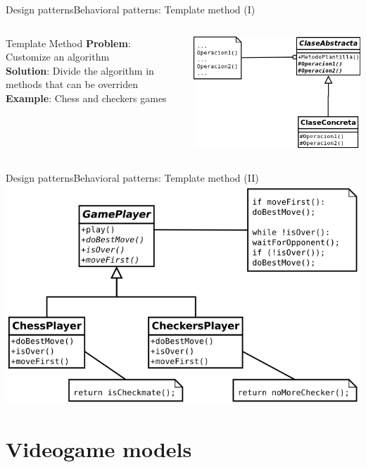 \documentclass[10pt,compress]{beamer} %
\begin{document}
\begin{frame}{Design patterns}{Behavioral patterns: Template method (I)}
    \begin{columns}
	   \begin{block}{Template Method}
			\textbf{Problem}: Customize an algorithm\\
			\textbf{Solution}: Divide the algorithm in methods that can be overriden\\
			\textbf{Example}: Chess and checkers games\\
		\end{block}
			\centering\includegraphics[width=0.8\linewidth]{figs/template}\\
	\end{columns}
\end{frame}

\begin{frame}{Design patterns}{Behavioral patterns: Template method (II)}
			\centering\includegraphics[width=0.6\linewidth]{figs/templategame}
\end{frame}

\section{Videogame models}
\end{document}
